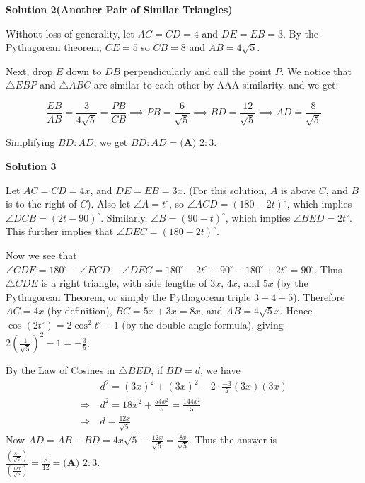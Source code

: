 \begin{enumerate}
 


 



\textbf{Solution 2(Another Pair of Similar Triangles)}

Without loss of generality, let $AC = CD = 4$ and $DE = EB = 3$. By the Pythagorean theorem, $CE = 5$ so $CB = 8$ and $AB = 4\sqrt{5}$. 

 Next, drop $E$ down to $DB$ perpendicularly and call the point $P$. We notice that $\triangle EBP$ and $\triangle ABC$ are similar to each other by AAA similarity, and we get:

 
 \[\frac{EB}{AB} = \frac{3}{4\sqrt{5}} = \frac{PB}{CB} \implies PB = \frac{6}{\sqrt{5}} \implies BD = \frac{12}{\sqrt{5}} \implies AD = \frac{8}{\sqrt{5}}\]

 Simplifying $BD:AD$, we get $BD:AD = \boxed{\textbf{(A) } 2:3}$.

 



\textbf{Solution 3}

Let $AC=CD=4x$, and $DE=EB=3x$. (For this solution, $A$ is above $C$, and $B$ is to the right of $C$). Also let $\angle A = t^{\circ}$, so $\angle ACD = \left(180-2t\right)^{\circ}$, which implies $\angle DCB = \left(2t - 90\right)^{\circ}$. Similarly, $\angle B = \left(90-t\right)^{\circ}$, which implies $\angle BED = 2t^{\circ}$. This further implies that $\angle DEC = \left(180 - 2t\right)^{\circ}$. 

 Now we see that $\angle CDE = 180^{\circ} - \angle ECD - \angle DEC = 180^{\circ} - 2t^{\circ} + 90^{\circ} - 180^{\circ} + 2t^{\circ} = 90^{\circ}$. Thus $\triangle CDE$ is a right triangle, with side lengths of $3x$, $4x$, and $5x$ (by the Pythagorean Theorem, or simply the Pythagorean triple $3-4-5$). Therefore $AC=4x$ (by definition), $BC=5x+3x = 8x$, and $AB=4\sqrt{5}x$. Hence $\cos{\left(2t^{\circ}\right)} = 2 \cos^{2}{t^{\circ}} - 1$ (by the double angle formula), giving $2\left(\frac{1}{\sqrt{5}}\right)^2 - 1 = -\frac{3}{5}$.

 By the Law of Cosines in $\triangle BED$, if $BD = d$, we have 
 \[\begin{split}&d^2 = (3x)^2+(3x)^2-2\cdot\frac{-3}{5}(3x)(3x) \\ \Rightarrow \ &d^2 = 18x^2 + \frac{54x^2}{5} = \frac{144x^2}{5} \\ \Rightarrow \ &d = \frac{12x}{\sqrt{5}}\end{split}\] Now $AD = AB - BD = 4x\sqrt{5} - \frac{12x}{\sqrt{5}} = \frac{8x}{\sqrt{5}}$. Thus the answer is $\frac{\left(\frac{8x}{\sqrt{5}}\right)}{\left(\frac{12x}{\sqrt{5}}\right)} = \frac{8}{12} = \boxed{\textbf{(A) }2:3}$.


\end{enumerate}
